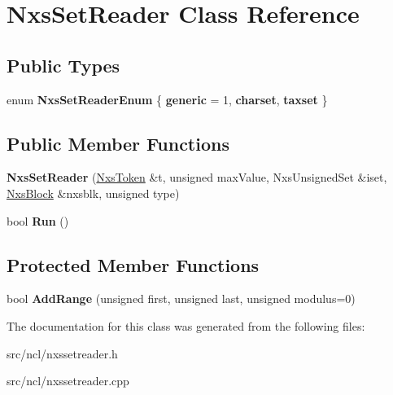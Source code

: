 \hypertarget{classNxsSetReader}{
\section{NxsSetReader Class Reference}
\label{classNxsSetReader}
}
\subsection*{Public Types}
\begin{DoxyCompactItemize}
\item 
enum {\bfseries NxsSetReaderEnum} \{ {\bfseries generic} =  1, 
{\bfseries charset}, 
{\bfseries taxset}
 \}
\end{DoxyCompactItemize}
\subsection*{Public Member Functions}
\begin{DoxyCompactItemize}
\item 
\hypertarget{classNxsSetReader_a6db0be01a8a93639a413acd60014200e}{
{\bfseries NxsSetReader} (\hyperlink{classNxsToken}{NxsToken} \&t, unsigned maxValue, NxsUnsignedSet \&iset, \hyperlink{classNxsBlock}{NxsBlock} \&nxsblk, unsigned type)}
\label{classNxsSetReader_a6db0be01a8a93639a413acd60014200e}

\item 
\hypertarget{classNxsSetReader_a28c0f1ed6842b24c5346693d36c0642d}{
bool {\bfseries Run} ()}
\label{classNxsSetReader_a28c0f1ed6842b24c5346693d36c0642d}

\end{DoxyCompactItemize}
\subsection*{Protected Member Functions}
\begin{DoxyCompactItemize}
\item 
\hypertarget{classNxsSetReader_afbb627dcc53f244dbf94539dc49417ea}{
bool {\bfseries AddRange} (unsigned first, unsigned last, unsigned modulus=0)}
\label{classNxsSetReader_afbb627dcc53f244dbf94539dc49417ea}

\end{DoxyCompactItemize}


The documentation for this class was generated from the following files:\begin{DoxyCompactItemize}
\item 
src/ncl/nxssetreader.h\item 
src/ncl/nxssetreader.cpp\end{DoxyCompactItemize}
